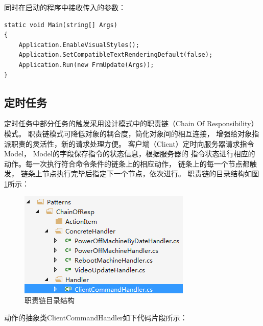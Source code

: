 \documentclass{book}
\begin{document}
同时在启动的程序中接收传入的参数：
\begin{lstlisting}
static void Main(string[] Args)
{  
    Application.EnableVisualStyles();
    Application.SetCompatibleTextRenderingDefault(false);
    Application.Run(new FrmUpdate(Args));    
}
\end{lstlisting}

\subsection{定时任务}

定时任务中部分任务的触发采用设计模式中的职责链（Chain Of Responsibility）模式。
职责链模式可降低对象的耦合度，简化对象间的相互连接，
增强给对象指派职责的灵活性，新的请求处理方便。
客户端（Client）定时向服务器请求指令Model，
Model的字段保存指令的状态信息，根据服务器的
指令状态进行相应的动作。每一次执行符合命令条件的链条上的相应动作，
链条上的每一个节点都触发，
链条上节点执行完毕后指定下一个节点，依次进行。
职责链的目录结构如图\ref{fig:ChainOfResponsibilityContentStructure}所示：

\begin{figure}[htbp]
	\centering
	\includegraphics[scale=1]{ChainOfResponsibilityContentStructure.png}
	\caption{职责链目录结构}
	\label{fig:ChainOfResponsibilityContentStructure}
\end{figure}

动作的抽象类ClientCommandHandler如下代码片段所示：
\end{document}
